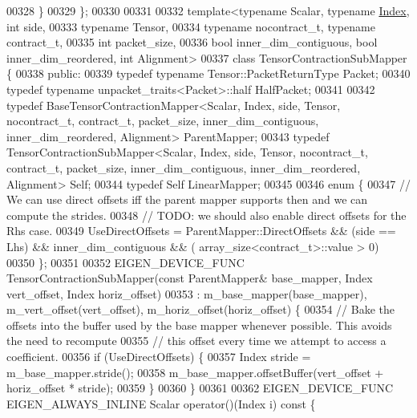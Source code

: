 \begin{DoxyCode}
00328   \}
00329 \};
00330 
00331 
00332 \textcolor{keyword}{template}<\textcolor{keyword}{typename} Scalar, \textcolor{keyword}{typename} \hyperlink{namespace_eigen_a62e77e0933482dafde8fe197d9a2cfde}{Index}, \textcolor{keywordtype}{int} side,
00333          \textcolor{keyword}{typename} Tensor,
00334          \textcolor{keyword}{typename} nocontract\_t, \textcolor{keyword}{typename} contract\_t,
00335          \textcolor{keywordtype}{int} packet\_size,
00336          \textcolor{keywordtype}{bool} inner\_dim\_contiguous, \textcolor{keywordtype}{bool} inner\_dim\_reordered, \textcolor{keywordtype}{int} Alignment>
00337 \textcolor{keyword}{class }TensorContractionSubMapper \{
00338  \textcolor{keyword}{public}:
00339   \textcolor{keyword}{typedef} \textcolor{keyword}{typename} Tensor::PacketReturnType Packet;
00340   \textcolor{keyword}{typedef} \textcolor{keyword}{typename} unpacket\_traits<Packet>::half HalfPacket;
00341 
00342   \textcolor{keyword}{typedef} BaseTensorContractionMapper<Scalar, Index, side, Tensor, nocontract\_t, contract\_t, packet\_size,
       inner\_dim\_contiguous, inner\_dim\_reordered, Alignment> ParentMapper;
00343   \textcolor{keyword}{typedef} TensorContractionSubMapper<Scalar, Index, side, Tensor, nocontract\_t, contract\_t, packet\_size,
       inner\_dim\_contiguous, inner\_dim\_reordered, Alignment> Self;
00344   \textcolor{keyword}{typedef} Self LinearMapper;
00345 
00346   \textcolor{keyword}{enum} \{
00347     \textcolor{comment}{// We can use direct offsets iff the parent mapper supports then and we can compute the strides.}
00348     \textcolor{comment}{// TODO: we should also enable direct offsets for the Rhs case.}
00349     UseDirectOffsets = ParentMapper::DirectOffsets && (side == Lhs) && inner\_dim\_contiguous && (
      array\_size<contract\_t>::value > 0)
00350   \};
00351 
00352   EIGEN\_DEVICE\_FUNC TensorContractionSubMapper(\textcolor{keyword}{const} ParentMapper& base\_mapper, Index vert\_offset, Index 
      horiz\_offset)
00353       : m\_base\_mapper(base\_mapper), m\_vert\_offset(vert\_offset), m\_horiz\_offset(horiz\_offset) \{
00354     \textcolor{comment}{// Bake the offsets into the buffer used by the base mapper whenever possible. This avoids the need to
       recompute}
00355     \textcolor{comment}{// this offset every time we attempt to access a coefficient.}
00356     \textcolor{keywordflow}{if} (UseDirectOffsets) \{
00357       Index stride = m\_base\_mapper.stride();
00358       m\_base\_mapper.offsetBuffer(vert\_offset + horiz\_offset * stride);
00359     \}
00360   \}
00361 
00362   EIGEN\_DEVICE\_FUNC EIGEN\_ALWAYS\_INLINE Scalar operator()(Index i)\textcolor{keyword}{ const }\{

\end{DoxyCode}
